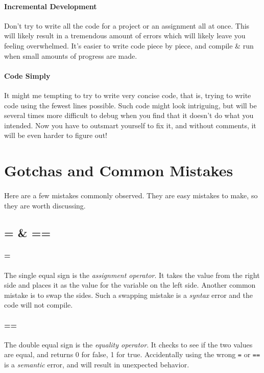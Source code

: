 \documentclass[letter,11pt]{article}
\begin{document}
\paragraph{Incremental Development}Don't try to write all the code for a project or an assignment all at once. This will likely result in a tremendous amount of errors which will likely leave you feeling overwhelmed. It's easier to write code piece by piece, and compile \& run when small amounts of progress are made.

\paragraph{Code Simply}It might me tempting to try to write very concise code, that is, trying to write code using the fewest lines possible. Such code might look intriguing, but will be several times more difficult to debug when you find that it doesn't do what you intended. Now you have to outsmart yourself to fix it, and without comments, it will be even harder to figure out!

\FloatBarrier
\newpage
\appendix
\section{Gotchas and Common Mistakes}
\paragraph{}Here are a few mistakes commonly observed. They are easy mistakes to make, so they are worth discussing.

\FloatBarrier
\subsection{= \& ==}
\paragraph{=}The single equal sign is the \textit{assignment operator}. It takes the value from the right side and places it as the value for the variable on the left side. Another common mistake is to swap the sides. Such a swapping mistake is a \textit{syntax} error and the code will not compile.

\paragraph{==}The double equal sign is the \textit{equality operator}. It checks to see if the two values are equal, and returns 0 for false, 1 for true. Accidentally using the wrong \texttt{=} or \texttt{==} is a \textit{semantic} error, and will result in unexpected behavior.
\end{document}
